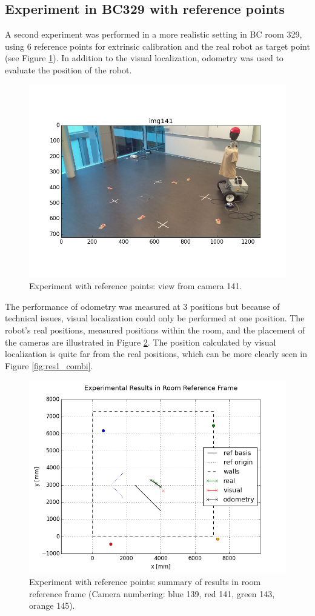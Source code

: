 \subsection{Experiment in BC329 with reference points}

A second experiment was performed in a more realistic setting in BC room 329, using 6 reference points for extrinsic calibration and the real robot as target point (see Figure \ref{fig:res1_img}). 
In addition to the visual localization, odometry was used to evaluate the position of the robot.
\begin{figure}
    \centering
    \includegraphics[width=.6\linewidth]{files/res1_img141.png}
    \caption{Experiment with reference points: view from camera 141.}
    \label{fig:res1_img}
\end{figure}
The performance of odometry was measured at 3 positions but because of technical issues, visual localization could only be performed at one position. 
The robot's real positions, measured positions within the room, and the placement of the cameras are illustrated in Figure \ref{fig:res1_room}.
The position calculated by visual localization is quite far from the real positions, which can be more clearly seen in Figure \ref{fig:res1_combi}. 

\begin{figure}
    \centering
    \includegraphics[width=.8\linewidth]{files/res1_room.png}
    \caption{Experiment with reference points: summary of results in room reference frame (Camera numbering: blue 139, red 141, green 143, orange 145).}
    \label{fig:res1_room}
\end{figure}

